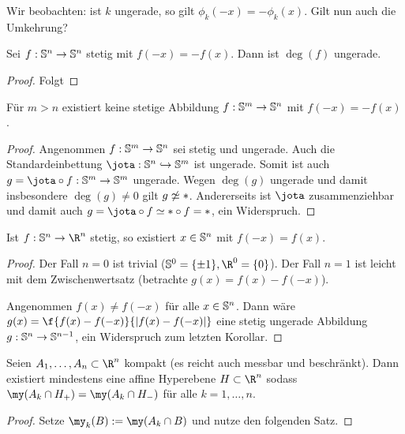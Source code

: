 Wir beobachten: ist $k$ ungerade, so gilt $\phi_k(-x) = -\phi_k(x)$.
Gilt nun auch die Umkehrung?

\begin{st}
	Sei $f: \S^n \to \S^n$ stetig mit $f(-x) = -f(x)$.
	Dann ist $\deg(f)$ ungerade.
	\begin{proof}
		Folgt
	\end{proof}
\end{st}


\begin{kor}
	Für $m > n$ existiert keine stetige Abbildung $f: \S^m \to \S^n$ mit $f(-x) = -f(x)$.
	\begin{proof}
		Angenommen $f: \S^m \to \S^n$ sei stetig und ungerade.
		Auch die Standardeinbettung $\jota: \S^n \injto \S^m$ ist ungerade.
		Somit ist auch $g = \jota \circ f: \S^m \to \S^m$ ungerade.
		Wegen $\deg(g)$ ungerade und damit insbesondere $\deg(g) \neq 0$ gilt $g \not\homotopic *$.
		Andererseits ist $\jota$ zusammenziehbar und damit auch $g = \jota \circ f \homotopic * \circ f = *$, ein Widerspruch.
	\end{proof}
\end{kor}

\begin{kor}
	Ist $f: \S^n \to \R^n$ stetig, so existiert $x \in \S^n$ mit $f(-x) = f(x)$.
	\begin{proof}
		Der Fall $n = 0$ ist trivial ($\S^0 = \{\pm 1\}, \R^0 = \{0\}$).
		Der Fall $n = 1$ ist leicht mit dem Zwischenwertsatz (betrachte $g(x) = f(x) - f(-x)$).

		Angenommen $f(x) \neq f(-x)$ für alle $x \in \S^n$.
		Dann wäre $g(x) = \f {f(x) - f(-x)}{|f(x) - f(-x)|}$ eine stetig ungerade Abbildung $g: \S^n \to \S^{n-1}$, ein Widerspruch zum letzten Korollar.
	\end{proof}
\end{kor}

\begin{st}
	Seien $A_1, \dotsc, A_n \subset \R^n$ kompakt (es reicht auch messbar und beschränkt).
	Dann existiert mindestens eine affine Hyperebene $H \subset \R^n$ sodass $\my(A_k \cap H_+) = \my(A_k \cap H_-)$ für alle $k = 1, \dotsc, n$.
	\begin{proof}
		Setze $\my_k(B) := \my(A_k \cap B)$ und nutze den folgenden Satz.
	\end{proof}
\end{st}

